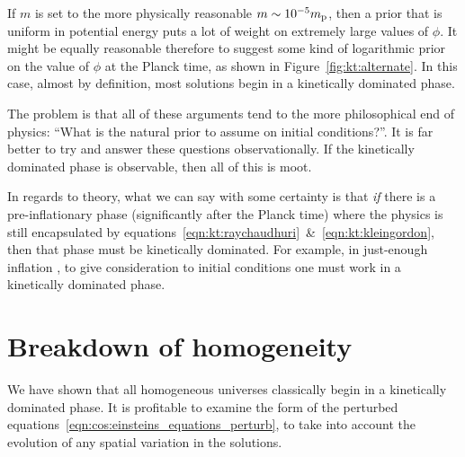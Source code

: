 If \(m\) is set to the more physically reasonable \(m\sim10^{-5}m_{\mathrm{p}}\), then a prior that is uniform in potential energy puts a lot of weight on extremely large values of \(\phi\). It might be equally reasonable therefore to suggest some kind of logarithmic prior on the value of \(\phi\) at the Planck time, as shown in Figure~\ref{fig:kt:alternate}. In this case, almost by definition, most solutions begin in a kinetically dominated phase.

The problem is that all of these arguments tend to the more philosophical end of physics: ``What is the natural prior to assume on initial conditions?''. It is far better to try and answer these questions observationally. If the kinetically dominated phase is observable, then all of this is moot.

In regards to theory, what we can say with some certainty is that {\em if\/} there is a pre-inflationary phase (significantly after the Planck time) where the physics is still encapsulated by equations~\eqref{eqn:kt:raychaudhuri}~\&~\eqref{eqn:kt:kleingordon}, then that phase must be kinetically dominated. For example, in just-enough inflation \citep{Ramirez_excluded_2009,Ramirez_predictions_2012}, to give consideration to initial conditions one must work in a kinetically dominated phase.





\section{Breakdown of homogeneity}
We have shown that all homogeneous universes classically begin in a kinetically dominated phase. It is profitable to examine the form of the perturbed equations~\eqref{eqn:cos:einsteins_equations_perturb}, to take into account the evolution of any spatial variation in the solutions.

